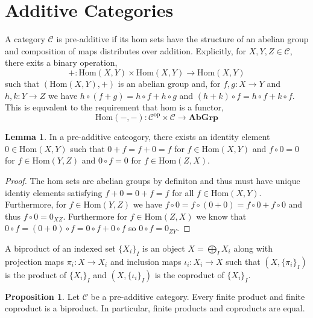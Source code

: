 \documentclass[12pt]{article}
\newcommand{\Hom}[2]{\mathrm{Hom}\left(#1, #2 \right)}
\newcommand{\AbGrp}{\mathbf{AbGrp}}
\theoremstyle{remark}
\theoremstyle{definition}
\newtheorem{lemma}[theorem]{Lemma}
\newtheorem{proposition}[theorem]{Proposition}
\newenvironment{definition}[1][Definition:]{\begin{trivlist}
\item[\hskip \labelsep {\bfseries #1}]}{\end{trivlist}}
\begin{document}
\section{Additive Categories}

\begin{definition}
A category $\mathcal{C}$ is pre-additive if its hom sets have the structure of an abelian group and composition of maps distributes over addition. Explicitly, for $X, Y, Z \in \mathcal{C}$, there exits a binary operation,
\[ + :  \Hom{X}{Y} \times \Hom{X}{Y} \to \Hom{X}{Y}\]
such that $(\Hom{X}{Y}, +)$ is an abelian group and, for $f, g : X \to Y$ and $h, k : Y \to Z$ we have $h \circ (f + g) = h \circ f + h \circ g$ and $(h + k) \circ f = h \circ f + k \circ f$. This is equvalent to the requirement that hom is a functor,
\[ \Hom{-}{-} : \mathcal{C}^{\mathrm{op}} \times \mathcal{C} \to \AbGrp \]
\end{definition}

\begin{lemma}
In a pre-additive cateogory, there exists an identity element $0 \in \Hom{X}{Y}$ such that $0 + f = f + 0 = f$ for $f \in \Hom{X}{Y}$ and $f \circ 0 = 0$ for $f \in \Hom{Y}{Z}$ and $0 \circ f = 0$ for $f \in \Hom{Z}{X}$.  
\end{lemma}

\begin{proof}
The hom sets are abelian groups by definiton and thus must have unique identiy elements satisfying $f + 0 = 0 + f = f$ for all $f \in \Hom{X}{Y}$. Furthermore, for $f \in \Hom{Y}{Z}$ we have $f \circ 0 = f \circ (0 + 0) = f \circ 0 + f \circ 0$ and thus $f \circ 0 = 0_{XZ}$. Furthermore for $f \in \Hom{Z}{X}$ we know that $0 \circ f = (0 + 0) \circ f = 0 \circ f + 0 \circ f$ so $0 \circ f = 0_{ZY}$.  
\end{proof}

\begin{definition}
A biproduct of an indexed set $\{X_i\}_I$ is an object $X = \bigoplus_I X_i$ along with projection maps $\pi_i : X \to X_i$ and inclusion maps $\iota_i : X_i \to X$ such that $(X, \{ \pi_i \}_I)$ is the product of $\{X_i\}_I$ and $(X, \{ \iota_i \}_I )$ is the coproduct of $\{ X_i \}_I$.  
\end{definition}



\begin{proposition}
Let $\mathcal{C}$ be a pre-additive category. Every finite product and finite coproduct is a biproduct. In particular, finite products and coproducts are equal. 
\end{proposition}
\end{document}
